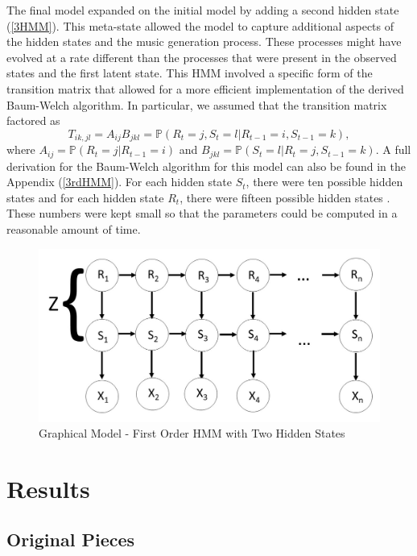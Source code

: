 \documentclass{article} %
\begin{document}
The final model expanded on the initial model by adding a second hidden state (\autoref{3HMM}). This meta-state allowed the model to capture additional aspects of the hidden states and the music generation process.  These processes might have evolved at a rate different than the processes that were present in the observed states and the first latent state.  This HMM involved a specific form of the transition matrix that allowed for a more efficient implementation of the derived Baum-Welch algorithm.  In particular, we assumed that the transition matrix factored as
$$T_{ik, jl} = A_{ij}B_{jkl} = \mathbb{P}(R_t = j, S_t = l | R_{t-1} = i, S_{t-1} = k),$$
where $A_{ij} = \mathbb{P}(R_t = j | R_{t-1} = i)$ and $B_{jkl} = \mathbb{P}(S_t = l | R_t = j, S_{t-1} = k)$.  A full derivation for the Baum-Welch algorithm for this model can also be found in the Appendix (\autoref{3rdHMM}). For each hidden state $S_t$, there were ten possible hidden states and for each hidden state $R_t$, there were fifteen possible hidden states . These numbers were kept small so that the parameters could be computed in a reasonable amount of time.

\begin{figure}[H]
\centering

\includegraphics [scale = 0.35] {Model3.jpg}
\caption{Graphical Model - First Order HMM with Two Hidden States\label{3HMM}}
\end{figure}


\section{Results}

\subsection{Original Pieces}
\end{document}
